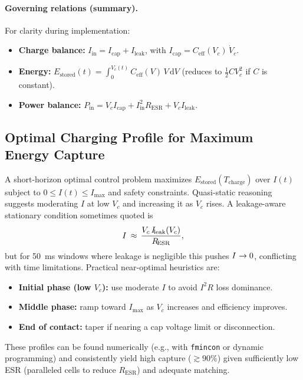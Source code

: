 \documentclass[11pt]{article}
\begin{document}
\paragraph{Governing relations (summary).} For clarity during implementation:
\begin{itemize}
  \item \textbf{Charge balance:} $I_{\!\mathrm{in}} = I_{\!\mathrm{cap}} + I_{\!\mathrm{leak}}$, with $I_{\!\mathrm{cap}} = C_{\!\mathrm{eff}}(V_c)\,\dot V_c$.
  \item \textbf{Energy:} $E_{\!\mathrm{stored}}(t) = \int_0^{V_c(t)} C_{\!\mathrm{eff}}(V)\,V\,\mathrm{d}V$ (reduces to $\tfrac{1}{2}CV_c^2$ if $C$ is constant).
  \item \textbf{Power balance:} $P_{\!\mathrm{in}} = V_c I_{\!\mathrm{cap}} + I_{\!\mathrm{in}}^2 R_{\!\mathrm{ESR}} + V_c I_{\!\mathrm{leak}}$.
\end{itemize}

\subsection{Optimal Charging Profile for Maximum Energy Capture}
A short-horizon optimal control problem maximizes $E_{\!\mathrm{stored}}(T_{\!\mathrm{charge}})$ over $I(t)$ subject to $0\le I(t)\le I_{\!\max}$ and safety constraints. Quasi-static reasoning suggests moderating $I$ at low $V_c$ and increasing it as $V_c$ rises. A leakage-aware stationary condition sometimes quoted is
\begin{equation}
  I^{\*} \,\approx\, \frac{V_c\, I_{\!\mathrm{leak}}(V_c)}{R_{\!\mathrm{ESR}}},
\end{equation}
but for 50~ms windows where leakage is negligible this pushes $I^{\*}\to0$, conflicting with time limitations. Practical near-optimal heuristics are:
\begin{itemize}
  \item \textbf{Initial phase (low $V_c$):} use moderate $I$ to avoid $I^2R$ loss dominance.
  \item \textbf{Middle phase:} ramp toward $I_{\!\max}$ as $V_c$ increases and efficiency improves.
  \item \textbf{End of contact:} taper if nearing a cap voltage limit or disconnection.
\end{itemize}
These profiles can be found numerically (e.g., with \texttt{fmincon} or dynamic programming) and consistently yield high capture (\(\gtrsim90\%\)) given sufficiently low ESR (paralleled cells to reduce $R_{\!\mathrm{ESR}}$) and adequate matching.
\end{document}
